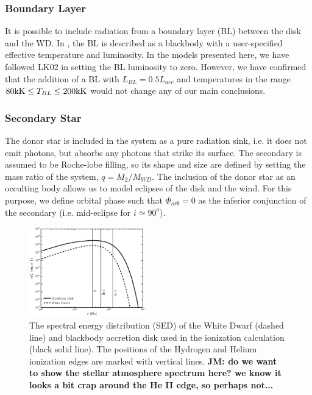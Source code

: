 \documentclass[preprint, a4paper, 11pt]{aastex}
\begin{document}
\subsubsection{Boundary Layer}

It is possible to include radiation from a boundary layer (BL) between
the disk and the WD. In \py, the BL is described as
a blackbody with a user-specified effective temperature and
luminosity. In the models presented here, we have followed LK02 in setting
the BL luminosity to zero. However, we have confirmed that the addition of a
BL with $L_{BL} = 0.5 L_{acc}$ and temperatures in the range $80{\rm
kK} \leq T_{BL} \leq 200{\rm kK}$ would not change any of our main
conclusions. 

\subsubsection{Secondary Star}

The donor star is included in the system as a pure radiation sink, 
i.e. it does not emit photons, but absorbs any photons that strike its
surface. The secondary is assumed to be Roche-lobe filling, so its
shape and size are defined by setting the mass ratio of the system, $q
= M_2/M_{WD}$. The inclusion of the donor star as an occulting body
allows us to model eclipses of the disk and the wind. For this
purpose, we define orbital phase such that $\Phi_{orb} = 0$ as the
inferior conjunction of the secondary (i.e. mid-eclipse for $i \simeq
90^o$).

\begin{figure}
\centering
\includegraphics[width=0.45\textwidth]{figures/sed_figure.eps}
\caption{
The spectral energy distribution (SED) of the 
White Dwarf (dashed line) and blackbody accretion
disk used in the ionization calculation (black solid line).
The positions of the Hydrogen and Helium ionization edges 
are marked with vertical lines.
{\bf JM: do we want to show the stellar atmosphere spectrum here?
we know it looks a bit crap around the He II edge, so perhaps not...
 }
 }
\label{sed}
\end{figure}
\end{document}
